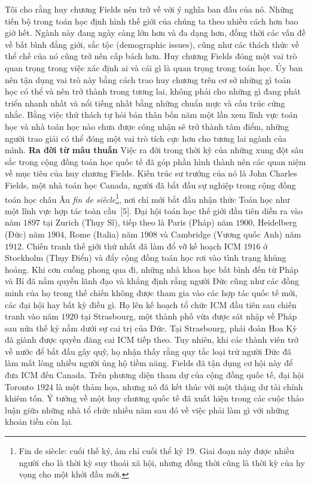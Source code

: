 \begin{multicols}{2}
	\vskip 0.1cm
	Tôi cho rằng huy chương Fields nên trở về với ý nghĩa ban đầu của nó. Những tiến bộ trong toán học định hình thế giới của chúng ta theo nhiều cách hơn bao giờ hết. Ngành này đang ngày càng lớn hơn và đa dạng hơn, đồng thời các vấn đề về bất bình đẳng giới, sắc tộc (demographic issues), cũng như các thách thức về thể chế của nó cũng trở nên cấp bách hơn. Huy chương Fields đóng một vai trò quan trọng trong việc xác định ai và cái gì là quan trọng trong toán học. 
	\vskip 0.1cm
	Ủy ban nên tận dụng vai trò này bằng cách trao huy chương trên cơ sở những gì toán học có thể và nên trở thành trong tương lai, không phải cho những gì đang phát triển nhanh nhất và nổi tiếng nhất bằng những chuẩn mực và cấu trúc cứng nhắc. Bằng việc thử thách tự hỏi bản thân bốn năm một lần xem lĩnh vực toán học và nhà toán học nào chưa được công nhận sẽ trở thành tâm điểm, những người trao giải có thể đóng một vai trò tích cực hơn cho tương lai ngành của mình.
	\vskip 0.1cm
	\textbf{\color{lichsutoanhoc}Ra đời từ mâu thuẫn}
	\vskip 0.1cm
	Việc ra đời trong thời kỳ của những xung đột sâu sắc trong cộng đồng toán học quốc tế đã góp phần hình thành nên các quan niệm về mục tiêu của huy chương Fields. Kiến trúc sư trưởng của nó là John Charles Fields, một nhà toán học Canada, người đã bắt đầu sự nghiệp trong cộng đồng toán học châu Âu \textit{fin de siècle}\footnote[5]{\color{lichsutoanhoc}Fin de siècle: cuối thế kỷ, ám chỉ cuối thể kỷ 19. Giai đoạn này được nhiều người cho là thời kỳ suy thoái xã hội, nhưng đồng thời cũng là thời kỳ của hy vọng cho một khởi đầu mới.}, nơi chỉ mới bắt đầu nhận thức Toán học như một lĩnh vực hợp tác toàn cầu~[$5$].
	\vskip 0.1cm
	Đại hội toán học thế giới đầu tiên diễn ra vào năm $1897$ tại Zurich (Thụy Sĩ), tiếp theo là Paris (Pháp) năm $1900$, Heidelberg (Đức) năm $1904$, Rome (Italia) năm $1908$ và Cambridge (Vương quốc Anh) năm $1912$. Chiến tranh thế giới thứ nhất đã làm đổ vỡ kế hoạch ICM $1916$ ở Stockholm (Thụy Điển) và đẩy cộng đồng toán học rơi vào tình trạng khủng hoảng.
	\vskip 0.1cm
	Khi cơn cuồng phong qua đi, những nhà khoa học bất bình đến từ Pháp và Bỉ đã nắm quyền lãnh đạo và khẳng định rằng người Đức cũng như các đồng minh của họ trong thế chiến không được tham gia vào các hợp tác quốc tế mới, các đại hội hay bất kỳ điều gì. Họ lên kế hoạch tổ chức ICM đầu tiên sau chiến tranh vào năm $1920$ tại Strasbourg, một thành phố vừa được sát nhập về Pháp sau nửa thế kỷ nằm dưới sự cai trị của Đức.
	\vskip 0.1cm
	Tại Strasbourg, phái đoàn Hoa Kỳ đã giành được quyền đăng cai ICM tiếp theo. Tuy nhiên, khi các thành viên trở về nước để bắt đầu gây quỹ, họ nhận thấy rằng quy tắc loại trừ người Đức đã làm mất lòng nhiều người ủng hộ tiềm năng. Fields đã tận dụng cơ hội này để đưa ICM đến Canada. Trên phương diện tham dự của cộng đồng quốc tế, đại hội Toronto $1924$ là một thảm họa, nhưng nó đã kết thúc với một thặng dư tài chính khiêm tốn. Ý tưởng về một huy chương quốc tế đã xuất hiện trong các cuộc thảo luận giữa những nhà tổ chức nhiều năm sau đó về việc phải làm gì với những khoản tiền còn lại.

\end{multicols}
